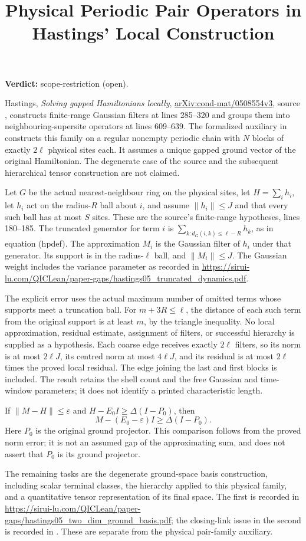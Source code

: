 \documentclass{article}
\title{Physical Periodic Pair Operators in Hastings' Local Construction}
\author{}
\date{}
\providecommand{\gapnote}[2]{\par\noindent\textbf{Verdict:} #1 (#2).\par}
\begin{document}
\maketitle
\gapnote{scope-restriction}{open}

Hastings, \emph{Solving gapped Hamiltonians locally},
\href{https://arxiv.org/abs/cond-mat/0508554v3}{arXiv:cond-mat/0508554v3},
source , constructs finite-range Gaussian filters at
lines 285--320 and groups them into neighbouring-supersite operators at
lines 609--639. The formalized auxiliary in
constructs this family on a regular nonempty periodic chain with $N$
blocks of exactly $2\ell$ physical sites each. It assumes a unique gapped
ground vector of the original Hamiltonian. The degenerate case of the source
and the subsequent hierarchical tensor construction are not claimed.

Let $G$ be the actual nearest-neighbour ring on the physical sites, let
$H=\sum_i h_i$, let $h_i$ act on the radius-$R$ ball about $i$, and assume
$\|h_i\|\le J$ and that every such ball has at most $S$ sites. These are the
source's finite-range hypotheses, lines 180--185. The truncated generator
for term $i$ is $\sum_{k:d_G(i,k)\le\ell-R}h_k$, as in equation (hpdef).
The approximation $M_i$ is the Gaussian filter of $h_i$ under that generator.
Its support is in the radius-$\ell$ ball, and $\|M_i\|\le J$.
The Gaussian weight includes the variance parameter as recorded in
\url{https://sirui-lu.com/QICLean/paper-gaps/hastings05_truncated_dynamics.pdf}.

The explicit error uses the actual maximum number of omitted terms whose
supports meet a truncation ball. For $m+3R\le\ell$, the distance of each such
term from the original support is at least $m$, by the triangle inequality.
No local approximation, residual estimate, assignment of filters, or
successful hierarchy is supplied as a hypothesis. Each coarse edge receives
exactly $2\ell$ filters, so its norm is at most $2\ell J$, its centred norm
at most $4\ell J$, and its residual is at most $2\ell$ times the proved
local residual. The edge joining the last and first blocks is included.
The result retains the shell count and the free Gaussian and time-window
parameters; it does not identify a printed characteristic length.

If $\|M-H\|\le\varepsilon$ and
$H-E_0I\ge\Delta(I-P_0)$, then
\[
 M-(E_0-\varepsilon)I\ge\Delta(I-P_0).
\]
Here $P_0$ is the original ground projector. This comparison follows from
the proved norm error; it is not an assumed gap of the approximating sum,
and does not assert that $P_0$ is its ground projector.

The remaining tasks are the degenerate ground-space basis construction,
including scalar terminal classes, the hierarchy applied to this physical
family, and a quantitative tensor representation of its final space.
The first is recorded in \url{https://sirui-lu.com/QICLean/paper-gaps/hastings05_two_dim_ground_basis.pdf}; the
closing-link issue in the second is recorded in
. These are separate from the
physical pair-family auxiliary.
\end{document}
